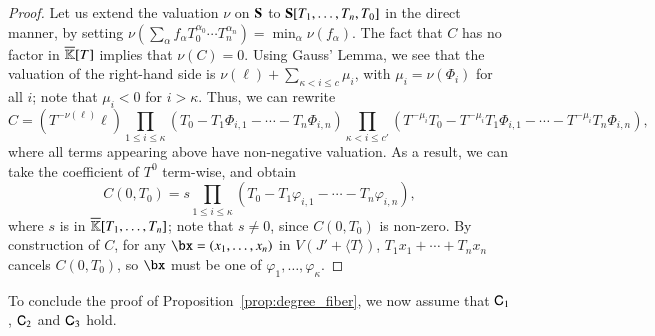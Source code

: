 \documentclass[amsthm]{elsart}
\begin{document}
\begin{proof}
  Let us extend the valuation $\nu$ on $\mathbf{S}$ to
  $\mathbf{S}[T_1,\dots,T_n,T_0]$ in the direct manner, by setting
  $\nu(\sum_\alpha f_\alpha T_0^{\alpha_0} \cdots T_n^{\alpha_n}) =
  \min_\alpha \nu(f_\alpha)$. The fact that $C$ has no factor in
  $\overline{\mathbb{K}}[T]$ implies that $\nu(C)=0$. Using Gauss' Lemma, we see that
  the valuation of the right-hand side is $\nu(\ell) + \sum_{\kappa <
    i \le c}\mu_i$, with $\mu_i= \nu(\Phi_i)$ for all $i$; note that
  $\mu_i < 0$ for $i > \kappa$. Thus, we can rewrite
  $$C =\left ({T}^{-\nu(\ell)} \ell\right ) 
  \prod_{1 \le i \le \kappa}(T_0-T_1 \Phi_{i,1} - \cdots - T_n  \Phi_{i,n} )
  \prod_{\kappa < i \le c'} ({T}^{-\mu_i}T_0-{T}^{-\mu_i}T_1 \Phi_{i,1} - \cdots - {T}^{-\mu_i}T_n  \Phi_{i,n} ),$$
  where all terms appearing above have non-negative valuation.
  As a result, we can take the coefficient of ${T}^0$ term-wise,
  and obtain
  $$C(0,T_0) = s \prod_{1 \le i \le \kappa}(T_0-T_1 \varphi_{i,1} -
  \cdots - T_n \varphi_{i,n} ),$$ where $s$ is in $\overline{\mathbb{K}}[T_1,\dots,T_n]$;
  note that $s \ne 0$, since $C(0,T_0)$ is non-zero.
 By construction of $C$, for any
  $\bx=(x_1,\dots,x_n)$ in $V(J'+\langle T \rangle)$, $T_1 x_1 + \cdots + T_n x_n$
  cancels $C(0,T_0)$, so $\bx$ must be one of
  $\varphi_1,\dots,\varphi_{\kappa}$.
\end{proof}

To conclude the proof of Proposition~\ref{prop:degree_fiber}, we now
assume that $\mathsf{C}_1$, $\mathsf{C}_2$ and $\mathsf{C}_3$ hold.
\end{document}
